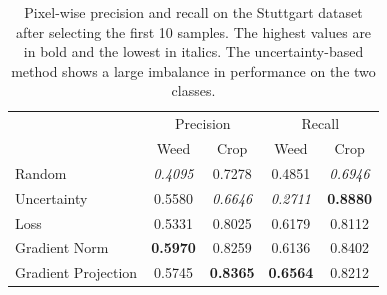        \begin{table}
        \vspace{1em}
        \centering
      \caption{Pixel-wise precision and recall on the Stuttgart dataset after selecting the first 10 samples. The highest values are in bold and the lowest in italics. The uncertainty-based method shows a large imbalance in performance on the two classes.}
        \begin{tabular}{@{}lcccc@{}} 
            \toprule
            & \multicolumn{2}{c}{Precision} & \multicolumn{2}{c}{Recall}\\ 
           \cmidrule{2-5} 
               & Weed & Crop & Weed & Crop \\ 
            \midrule 
    		  Random & \textit{0.4095} & 0.7278 & 0.4851 & \textit{0.6946}  \\ \addlinespace
    		  Uncertainty & 0.5580 & \textit{0.6646} & \textit{0.2711} & \textbf{0.8880}  \\ \addlinespace
    		  Loss & 0.5331 & 0.8025 & 0.6179 & 0.8112  \\ \addlinespace
    		  Gradient Norm & \textbf{0.5970} & 0.8259 & 0.6136 & 0.8402  \\ \addlinespace
    		  Gradient Projection & 0.5745 & \textbf{0.8365} & \textbf{0.6564} & 0.8212  \\ 
            \bottomrule
        \end{tabular}
        \label{tab:pixel_wise_10_stuttgart}
    \end{table}
   
   

